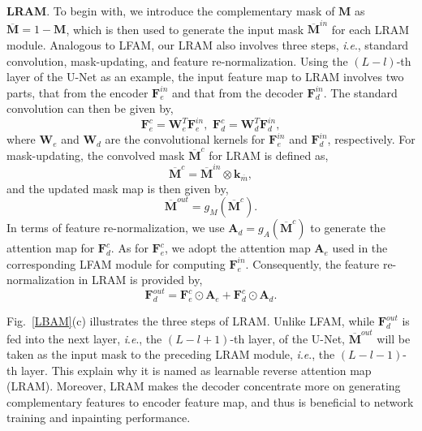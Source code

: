 \documentclass[10pt,journal,compsoc]{IEEEtran}
\newcommand{\ie}{\textit{i}.\textit{e}.}
\begin{document}
{\textbf{LRAM}.} To begin with, we introduce the complementary mask of $\mathbf{M}$ as $\overline{\mathbf{M}} = 1 - \mathbf{M}$, which is then used to generate the input mask $\overline{\mathbf{M}}^{in}$ for each LRAM module.
%
Analogous to LFAM, our LRAM also involves three steps, \ie, standard convolution, mask-updating, and feature re-normalization.
%
Using the $(L-l)$-th layer of the U-Net as an example, the input feature map to LRAM involves two parts, that from the encoder ${\mathbf{F}}^{in}_e$ and that from the decoder ${\mathbf{F}}^{in}_d$.
%
The standard convolution can then be given by,
%
\begin{equation}\label{LRAM-1}
	\mathbf{F}^{c}_e = \mathbf{W}_e^{T}\mathbf{F}^{in}_e, \,\, \mathbf{F}^{c}_d = \mathbf{W}_d^{T}\mathbf{F}^{in}_d,
\end{equation}
%
where $\mathbf{W}_e$ and $\mathbf{W}_d$ are the convolutional kernels for $\mathbf{F}^{in}_e$ and $\mathbf{F}^{in}_d$, respectively.
%
For mask-updating, the convolved mask $\overline{\mathbf{M}}^{c}$ for LRAM is defined as,
%
\begin{equation}\label{eqn:conv_mask3}
	\overline{\mathbf{M}}^{c} = \overline{\mathbf{M}}^{in} \otimes \mathbf{k}_{\overline{m}},
\end{equation}
%
and the updated mask map is then given by,
%
\begin{equation}\label{Activation_gM2}
	\overline{\mathbf{M}}^{out} = g_M(\overline{\mathbf{M}}^{c}).
\end{equation}
%
In terms of feature re-normalization, we use $\mathbf{A}_d = g_A(\overline{\mathbf{M}}^c)$ to generate the attention map for $\mathbf{F}^{c}_d$.
%
As for $\mathbf{F}^{c}_e$, we adopt the attention map $\mathbf{A}_e$ used in the corresponding LFAM module for computing ${\mathbf{F}}^{in}_e$.
%
Consequently, the feature re-normalization in LRAM is provided by,
%
\begin{equation}\label{renorm_lram}
	\mathbf{F}^{out}_d = \mathbf{F}^{c}_e \odot \mathbf{A}_e + \mathbf{F}^{c}_d \odot \mathbf{A}_d.
\end{equation}



Fig.~\ref{LBAM}(c) illustrates the three steps of LRAM.
%
Unlike LFAM, while $\mathbf{F}^{out}_d$ is fed into the next layer, \ie, the $(L-l+1)$-th layer, of the U-Net, $\overline{\mathbf{M}}^{out}$ will be taken as the input mask to the preceding LRAM module, \ie, the $(L-l-1)$-th layer.
%
This explain why it is named as learnable reverse attention map (LRAM).
%
Moreover, LRAM makes the decoder concentrate more on generating complementary features to encoder feature map, and thus is beneficial to network training and inpainting performance.
\end{document}
